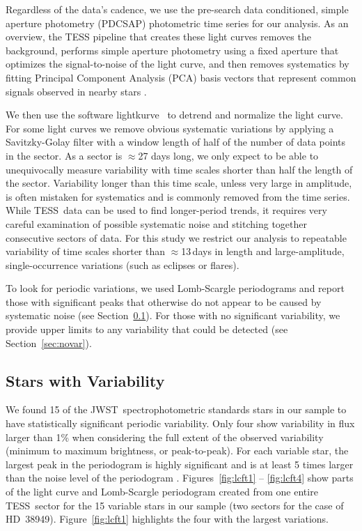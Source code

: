 \documentclass[twocolumn]{aastex631}
\newcommand{\webb}{JWST}
\newcommand{\tess}{TESS}
\newcommand{\lightkurve}{{{\fontfamily{lmtt}\selectfont lightkurve}}}
\begin{document}
Regardless of the data's cadence, we use the pre-search data conditioned, simple aperture photometry (PDCSAP) photometric time series \citep{kdph2020PDC} for our analysis. As an overview, the TESS pipeline that creates these light curves removes the background, performs simple aperture photometry using a fixed aperture that optimizes the signal-to-noise of the light curve, and then removes systematics by fitting Principal Component Analysis (PCA) basis vectors that represent common signals observed in nearby stars \citep{Smith2012,Stumpe2012PASP}. 

We then use the software \lightkurve\ \citep{lightkurve} to detrend and normalize the light curve. For some light curves we remove obvious systematic variations by applying a Savitzky-Golay filter \citep{savgol1964AnaCh..36.1627S} with a window length of half of the number of data points in the sector. As a sector is $\approx$27 days long, we only expect to be able to unequivocally measure variability with time scales shorter than half the length of the sector.  Variability longer than this time scale, unless very large in amplitude, is often mistaken for systematics and is commonly removed from the time series. While \tess\ data can be used to find longer-period trends, it requires very careful examination of possible systematic noise and stitching together consecutive sectors of data. For this study we restrict our analysis to repeatable variability of time scales shorter than $\approx$13\,days in length and large-amplitude, single-occurrence variations (such as eclipses or flares).

To look for periodic variations, we used Lomb-Scargle periodograms \citep{Lomb1976,lightkurve} and report those with significant peaks that otherwise do not appear to be caused by systematic noise (see Section~\ref{sec:var}).  For those with no significant variability, we provide upper limits to any variability that could be detected (see Section~\ref{sec:novar}).

\subsection{Stars with Variability}
\label{sec:var}

We found 15 of the \webb\ spectrophotometric standards stars in our sample to have statistically significant periodic variability. Only four show variability in flux larger than 1\% when considering the full extent of the observed variability (minimum to maximum brightness, or peak-to-peak).  For each variable star, the largest peak in the periodogram is highly significant and is at least 5 times larger than the noise level of the periodogram \citep{KjeldsenBedding1995, Baran2021}. Figures~\ref{fig:lcft1} -- \ref{fig:lcft4} show parts of the light curve and Lomb-Scargle periodogram created from one entire \tess\ sector for the 15 variable stars in our sample (two sectors for the case of HD~38949). 
Figure~\ref{fig:lcft1} highlights the four with the largest variations.  
\end{document}

